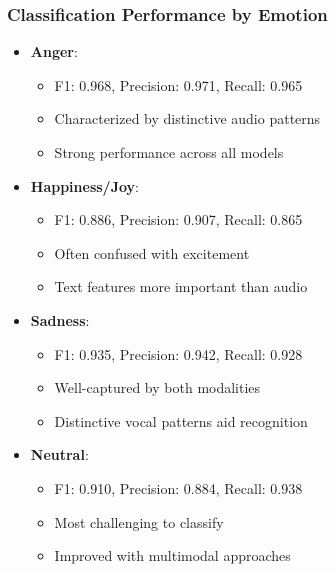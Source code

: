 \begin{frame}
\frametitle{Classification Performance by Emotion}
\begin{itemize}
    \item \textbf{Anger}:
    \begin{itemize}
        \item F1: 0.968, Precision: 0.971, Recall: 0.965
        \item Characterized by distinctive audio patterns
        \item Strong performance across all models
    \end{itemize}
    \item \textbf{Happiness/Joy}:
    \begin{itemize}
        \item F1: 0.886, Precision: 0.907, Recall: 0.865
        \item Often confused with excitement
        \item Text features more important than audio
    \end{itemize}
    \item \textbf{Sadness}:
    \begin{itemize}
        \item F1: 0.935, Precision: 0.942, Recall: 0.928
        \item Well-captured by both modalities
        \item Distinctive vocal patterns aid recognition
    \end{itemize}
    \item \textbf{Neutral}:
    \begin{itemize}
        \item F1: 0.910, Precision: 0.884, Recall: 0.938
        \item Most challenging to classify
        \item Improved with multimodal approaches
    \end{itemize}
\end{itemize}
\end{frame}

